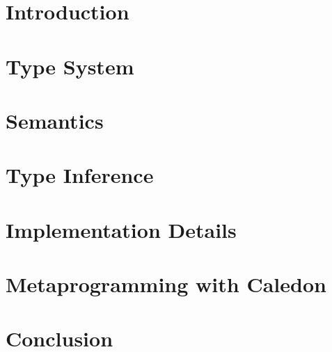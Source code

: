 \documentclass[12pt]{cmuthesis}
\begin{document}
\newtheorem{tcase}{Case}
     
\chapter{Introduction}
    
    
   
\chapter{Type System}
    
     
    
    
  
\chapter{Semantics}
    
    
    
    
    
    

          
\chapter{Type Inference} 
    
     
    

\chapter{Implementation Details}
    
    
     
    
    
    
    

\chapter{Metaprogramming with Caledon}
    
    
    
 
\chapter{Conclusion}
   
   
   
\appendix
 
\end{document}

